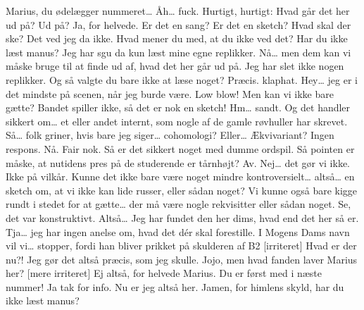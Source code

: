 \documentclass[a4paper,11pt]{article}
\begin{document}
\begin{sketch}
 Marius, du ødelægger nummeret…
 Åh… fuck. Hurtigt, hurtigt: Hvad går det her ud på?
 Ud på?
 Ja, for helvede. Er det en sang? Er det en sketch? Hvad skal der ske?
 Det ved jeg da ikke.
 Hvad mener du med, at du ikke ved det? Har du ikke læst manus?
 Jeg har sgu da kun læst mine egne replikker.
 Nå… men dem kan vi måske bruge til at finde ud af, hvad det her går ud på.
 Jeg har slet ikke nogen replikker.
 Og så valgte du bare ikke at læse noget?
 Præcis.
 klaphat.
 Hey… jeg er i det mindste på scenen, når jeg burde være.
 Low blow! Men kan vi ikke bare gætte? Bandet spiller ikke, så det er nok en sketch!
 Hm… sandt. Og det handler sikkert om… et eller andet internt, som nogle af de gamle røvhuller har skrevet.
 Så… folk griner, hvis bare jeg siger… cohomologi?
 Eller… Ækvivariant?
 Ingen respons. Nå. Fair nok. Så er det sikkert noget med dumme ordspil.
 Så pointen er måske, at nutidens pres på de studerende er tårnhøjt?
 Av. Nej… det gør vi ikke. Ikke på vilkår. Kunne det ikke bare være noget mindre kontroversielt… altså… en sketch om, at vi ikke kan lide russer, eller sådan noget?
 Vi kunne også bare kigge rundt i stedet for at gætte… der må være nogle rekvisitter eller sådan noget.
 Se, det var konstruktivt.
 Altså… Jeg har fundet den her dims, hvad end det her så er.
 Tja… jeg har ingen anelse om, hvad det dér skal forestille.
 I Mogens Dams navn vil vi…
 stopper, fordi han bliver prikket på skulderen af B2
[irriteret] Hvad er der nu?! Jeg gør det altså præcis, som jeg skulle.
 Jojo, men hvad fanden laver Marius her?
[mere irriteret] Ej altså, for helvede Marius. Du er først med i næste nummer!
 Ja tak for info. Nu er jeg altså her.
 Jamen, for himlens skyld, har du ikke læst manus?

\end{sketch}
\end{document}
